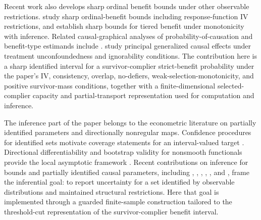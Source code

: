 Recent work also develops sharp ordinal benefit bounds under other observable restrictions. \citet{GabrielSachsJensen2024} study sharp ordinal-benefit bounds including response-function IV restrictions, and \citet{deAguasEtAl2025} establish sharp bounds for tiered benefit under monotonicity with inference. Related causal-graphical analyses of probability-of-causation and benefit-type estimands include \citet{TianPearl2000,SachsEtAl2023,DuarteEtAl2023}. \citet{ChenLi2026} study principal generalized causal effects under treatment unconfoundedness and ignorability conditions. The contribution here is a sharp identified interval for a survivor-complier strict-benefit probability under the paper's IV, consistency, overlap, no-defiers, weak-selection-monotonicity, and positive survivor-mass conditions, together with a finite-dimensional selected-complier capacity and partial-transport representation used for computation and inference.

The inference part of the paper belongs to the econometric literature on partially identified parameters and directionally nonregular maps. Confidence procedures for identified sets motivate coverage statements for an interval-valued target \citep{ImbensManski2004,ChernozhukovHongTamer2007,RomanoShaikh2010,Tamer2010,Molinari2020,ChernozhukovLeeRosen2013}. Directional differentiability and bootstrap validity for nonsmooth functionals provide the local asymptotic framework \citep{vanDerVaart1998,FangSantos2019,HongLi2018}. Recent contributions on inference for bounds and partially identified causal parameters, including \citet{Russell2021}, \citet{LevisEtAl2025}, \citet{BenMichael2025}, \citet{KhandamiryanSemenova2026}, \citet{Noack2026}, and \citet{LeeLiu2024}, frame the inferential goal: to report uncertainty for a set identified by observable distributions and maintained structural restrictions. Here that goal is implemented through a guarded finite-sample construction tailored to the threshold-cut representation of the survivor-complier benefit interval.
